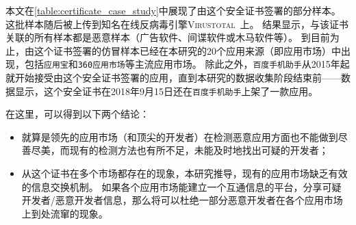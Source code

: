 本文在\autoref{table:certificate_case_study}中展现了由这个安全证书签署的部分样本。
这批样本随后被上传到知名在线反病毒引擎\textsc{Virustotal}~\cite{virustotal}上。
结果显示，与该证书关联的所有样本都是恶意样本（广告软件、间谍软件或木马软件等）。
到目前为止，由这个证书签署的仿冒样本已经在本研究的20个应用来源（即应用市场）中出现，包括\texttt{应用宝}和\texttt{360应用市场}等主流应用市场。
除此之外，\texttt{百度手机助手}从2015年起就开始接受由这个安全证书签署的应用，直到本研究的数据收集阶段结束前——数据显示，这个安全证书在2018年9月15日还在\texttt{百度手机助手}上架了一款应用。

在这里，可以得到以下两个结论：
\begin{itemize}
    \item 就算是领先的应用市场（和顶尖的开发者）在检测恶意应用方面也不能做到尽善尽美，而现有的检测方法也有所不足，未能及时地找出可疑的开发者；
    \item 从这个证书在多个市场都存在的现象，本研究推导，现有的应用市场缺乏有效的信息交换机制。
    如果各个应用市场能建立一个互通信息的平台，分享可疑开发者/恶意开发者信息，那么将可以杜绝一部分恶意开发者在各个应用市场上到处流窜的现象。
\end{itemize}

\vspace{5mm}
\noindent{}

